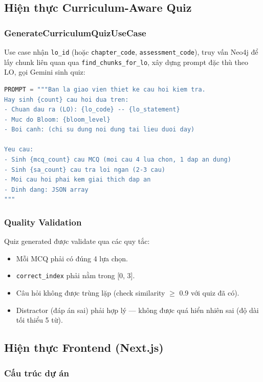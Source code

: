 \subsection{Hiện thực Curriculum-Aware Quiz}

\subsubsection{GenerateCurriculumQuizUseCase}

Use case nhận \texttt{lo\_id} (hoặc \texttt{chapter\_code},
\texttt{assessment\_code}), truy vấn Neo4j để lấy chunk liên
quan qua \texttt{find\_chunks\_for\_lo}, xây dựng prompt đặc
thù theo LO, gọi Gemini sinh quiz:

\begin{lstlisting}[language=Python, caption={Gemini quiz generation prompt (simplified)}]
PROMPT = """Ban la giao vien thiet ke cau hoi kiem tra.
Hay sinh {count} cau hoi dua tren:
- Chuan dau ra (LO): {lo_code} -- {lo_statement}
- Muc do Bloom: {bloom_level}
- Boi canh: (chi su dung noi dung tai lieu duoi day)

Yeu cau:
- Sinh {mcq_count} cau MCQ (moi cau 4 lua chon, 1 dap an dung)
- Sinh {sa_count} cau tra loi ngan (2-3 cau)
- Moi cau hoi phai kem giai thich dap an
- Dinh dang: JSON array
"""
\end{lstlisting}

\subsubsection{Quality Validation}

Quiz generated được validate qua các quy tắc:
\begin{itemize}
    \item Mỗi MCQ phải có đúng 4 lựa chọn.
    \item \texttt{correct\_index} phải nằm trong [0, 3].
    \item Câu hỏi không được trùng lặp (check similarity
          $\geq$ 0.9 với quiz đã có).
    \item Distractor (đáp án sai) phải hợp lý --- không được
          quá hiển nhiên sai (độ dài tối thiểu 5 từ).
\end{itemize}

\subsection{Hiện thực Frontend (Next.js)}

\subsubsection{Cấu trúc dự án}

